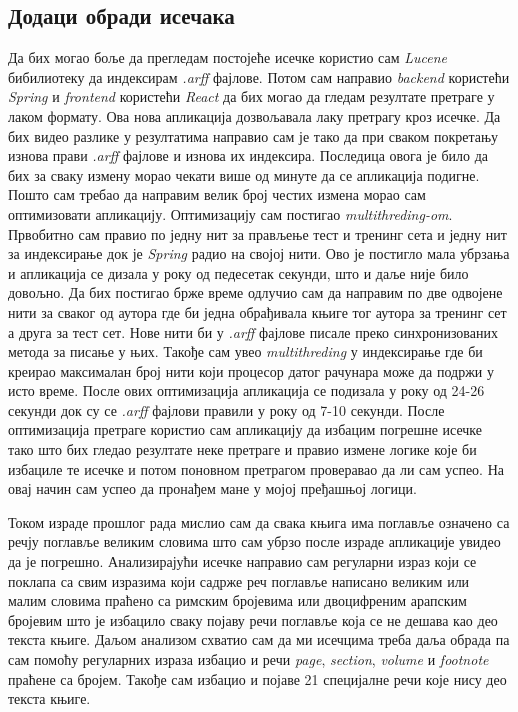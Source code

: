 \documentclass[11pt]{article}
\begin{document}
\subsection{Додаци обради исечака}
Да бих могао боље да прегледам постојеће исечке користио сам \emph{Lucene} бибилиотеку да индексирам \emph{.arff} фајлове. Потом сам направио \emph{backend} користећи \emph{Spring} и \emph{frontend} користећи \emph{React} да бих могао да гледам резултате претраге у лаком формату. Ова нова апликација дозвољавала лаку претрагу кроз исечке. Да бих видео разлике у резултатима направио сам је тако да при сваком покретању изнова прави \emph{.arff} фајлове и изнова их индексира. Последица овога је било да бих за сваку измену морао чекати више од минуте да се апликација подигне. Пошто сам требао да направим велик број честих измена морао сам оптимизовати апликацију. Оптимизацију сам постигао \emph{multithreding-om}. Првобитно сам правио по једну нит за прављење тест и тренинг сета и једну нит за индексирање док је \emph{Spring} радио на својој нити. Ово је постигло мала убрзања и апликација се дизала у року од педесетак секунди, што и даље није било довољно. Да бих постигао брже време одлучио сам да направим по две одвојене нити за сваког од аутора где би једна обрађивала књиге тог аутора за тренинг сет а друга за тест сет. Нове нити би у \emph{.arff} фајлове писале преко синхронизованих метода за писање у њих. Такође сам увео  \emph{multithreding} у индексирање где би креирао максималан број нити који процесор датог рачунара може да подржи у исто време. После ових оптимизација апликација се подизала у року од 24-26 секунди док су се \emph{.arff} фајлови правили у року од 7-10 секунди. После оптимизација претраге користио сам апликацију да избацим погрешне исечке тако што бих гледао резултате неке претраге и правио измене логике које би избациле те исечке и потом поновном претрагом проверавао да ли сам успео. На овај начин сам успео да пронађем мане у мојој пређашњој логици. 

Током израде прошлог рада мислио сам да свака књига има поглавље означено са речју поглавље великим словима што сам убрзо после израде апликације увидео да је погрешно. Анализирајући исечке направио сам регуларни израз који се поклапа са свим изразима који садрже реч поглавље написано великим или малим словима праћено са римским бројевима или двоцифреним арапским бројевим што је избацило сваку појаву речи поглавље која се не дешава као део текста књиге. Даљом анализом схватио сам да ми исечцима треба даља обрада па сам помоћу регуларних израза избацио и речи \emph{page}, \emph{section}, \emph{volume} и \emph{footnote} праћене са бројем. Такође сам избацио и појаве 21 специјалне речи које нису део текста књиге.
\end{document}
